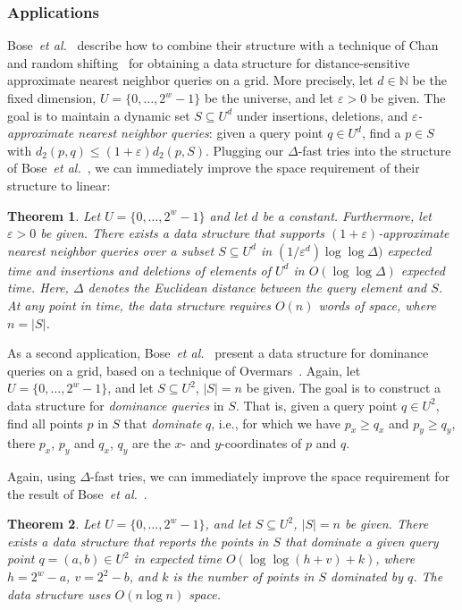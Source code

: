 \documentclass[a4paper,11pt]{article}
\newtheorem{theorem}{Theorem}[section]
\newcommand{\eps}{\varepsilon}
\newcommand{\N}{\mathbb{N}}
\newcommand{\etal}{\emph{et al.}\xspace}
\newcommand{\?}{\mskip1.5mu}
\begin{document}
\subsubsection{Applications}

Bose~\etal~\cite{BoseDoDuHoMo13} describe how to combine their structure
with a technique of Chan~\cite{Chan02} and random 
shifting~\cite[Chapter~11]{HarPeled11} for obtaining a data structure for 
distance-sensitive
approximate nearest neighbor queries on a grid.
More precisely, let $d \in \N$ be the fixed dimension, 
$U = \{0, \dots, 2^{w}-1\}$ be the universe, and
let $\eps > 0$ be given.
The goal is to maintain a dynamic set $S \subseteq U^d$ under
insertions, deletions, and \emph{$\eps$-approximate
nearest neighbor queries}: given a query point $q \in U^d$,
find a $p \in S$ with $d_2(p,q) \leq (1+\eps)d_2(p, S)$.
Plugging our $\Delta$-fast tries into the structure of
Bose~\etal~\cite[Theorem~9]{BoseDoDuHoMo13}, we can
immediately improve the space requirement of their structure to linear:
\begin{theorem}
Let $U = \{0, \dots, 2^w-1\}$ and let $d$ be a constant.
Furthermore, let $\eps > 0$ be given.
There exists a data structure that supports $(1+\eps)$-approximate
nearest neighbor queries over a subset $S \subseteq U^d$ in 
$(1/\eps^d)\log\log \Delta)$ expected time and insertions and deletions
of elements of $U^d$ in $O(\log\log \Delta)$ expected time.
Here, $\Delta$ denotes the Euclidean distance between the query element
and $S$. At any point in time, the data structure requires $O(n)$
words of space, where $n  = |S|$.
\end{theorem}

As a second application, Bose~\etal~\cite{BoseDoDuHoMo13}
present a data structure for dominance queries on a grid,
based on a technique of Overmars~\cite{Overmars88}.
Again, let $U = \{0, \dots, 2^w-1\}$, and let $S \subseteq U^2$,
$|S| = n$ be given. The goal is to construct a data structure
for \emph{dominance queries} in $S$. That is, given a query point
$q \in U^2$, find all points $p$ in $S$ that \emph{dominate} $q$,
i.e., for which we have $p_x \geq q_x$ and $p_y \geq q_y$, there
$p_x$, $p_y$ and $q_x$, $q_y$ are the $x$- and $y$-coordinates 
of $p$ and $q$.

Again, using $\Delta$-fast tries, we can immediately improve the
space requirement for the result of 
Bose~\etal~\cite[Theorem~10, Corollary~13]{BoseDoDuHoMo13}.

\begin{theorem}
Let $U = \{0, \dots, 2^w-1\}$, and let $S \subseteq U^2$, $|S|=n$
be given. There exists a data structure that reports the points in $S$
that dominate a given query point $q = (a,b) \in U^2$ in expected time
$O(\log\log(h+v) + k)$, where $h = 2^w - a$, $v = 2^2-b$, and $k$
is the number of points in $S$ dominated by $q$.
The data structure uses $O(n \log n)$ space.
\end{theorem}
\end{document}
